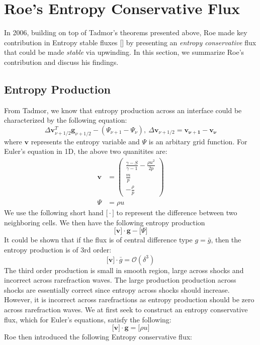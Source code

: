 \documentclass[a4paper]{article}
\numberwithin{equation}{section}
\begin{document}
\section{Roe's Entropy Conservative Flux}
In 2006, building on top of Tadmor's theorems presented above, Roe made key contribution in Entropy stable fluxes [] by presenting an \textit{entropy conservative} flux that could be made \textit{stable} via upwinding. In this section, we summarize Roe's contribution and discuss his findings.

\subsection{Entropy Production}
From Tadmor, we know that entropy production across an interface could be characterized by the following equation:
\begin{equation}
    \Delta \mathbf{v}_{\nu + 1/2}^T \mathbf{g}_{\nu + 1/2} - (\Psi_{\nu + 1} - \Psi_\nu), \ \Delta \mathbf{v}_{\nu + 1/2} = \mathbf{v_{\nu + 1}} - \mathbf{v}_\mathbf{\nu}
\end{equation}
where $\mathbf{v}$ represents the entropy variable and $\Psi$ is an arbitary grid function. For Euler's equation in 1D, the above two quanitites are:
\begin{equation}
    \begin{split}
        \mathbf{v} &= 
        \begin{pmatrix}
            \frac{\gamma - S}{\gamma - 1}-\frac{\rho u^2}{2p} \\
            \frac{m}{p}\\
            -\frac{\rho}{p}
        \end{pmatrix}\\
        \Psi &= \rho u
    \end{split}
\end{equation} 
We use the following short hand $\big[\cdot \big]$ to represent the difference between two neighboring cells. We then have the following entropy production
\begin{equation}
    \big[\mathbf{v}\big] \cdot \mathbf{g} - \big[\Psi\big]
\end{equation}
It could be shown that if the flux is of central difference type $g = \bar{g}$, then the entropy production is of 3rd order:
\begin{equation}
    \big[\mathbf{v}\big] \cdot \bar{g} = \mathcal{O}(\delta^3)
\end{equation}
The third order production is small in smooth region, large across shocks and incorrect across rarefraction waves. The large production production across shocks are essentially correct since entropy across shocks should increase. However, it is incorrect across rarefractions as entropy production should be zero across rarefraction waves. We at first seek to construct an entropy conservative flux, which for Euler's equations, satisfy the following:
\begin{equation}
    \big[\mathbf{v}\big] \cdot \mathbf{g} = \big[\rho u\big]
\end{equation}
Roe then introduced the following Entropy conservative flux:
\end{document}
